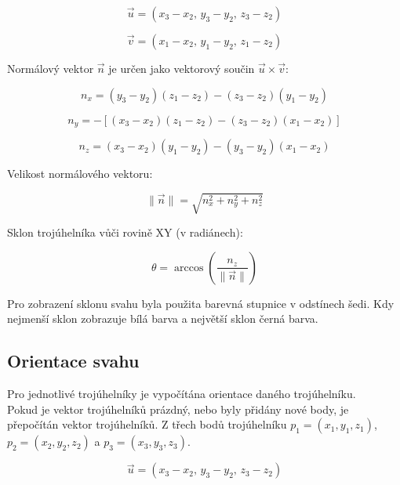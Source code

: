 \begin{equation}
\vec{u} = (x_3 - x_2,\, y_3 - y_2,\, z_3 - z_2)
\end{equation}

\begin{equation}
\vec{v} = (x_1 - x_2,\, y_1 - y_2,\, z_1 - z_2)
\end{equation}

Normálový vektor $\vec{n}$ je určen jako vektorový součin $\vec{u} \times \vec{v}$:

\begin{equation}
n_x = (y_3 - y_2)(z_1 - z_2) - (z_3 - z_2)(y_1 - y_2)
\end{equation}

\begin{equation}
n_y = -\left[(x_3 - x_2)(z_1 - z_2) - (z_3 - z_2)(x_1 - x_2)\right]
\end{equation}

\begin{equation}
n_z = (x_3 - x_2)(y_1 - y_2) - (y_3 - y_2)(x_1 - x_2)
\end{equation}

Velikost normálového vektoru:

\begin{equation}
\|\vec{n}\| = \sqrt{n_x^2 + n_y^2 + n_z^2}
\end{equation}

Sklon trojúhelníka vůči rovině XY (v radiánech):

\begin{equation}
\theta = \arccos\left( \frac{n_z}{\|\vec{n}\|} \right)
\end{equation}

Pro zobrazení sklonu svahu byla použita barevná stupnice v odstínech šedi. Kdy nejmenší sklon zobrazuje bílá barva a největší sklon černá barva.


\subsection{Orientace svahu}
Pro jednotlivé trojúhelníky je vypočítána orientace daného trojúhelníku.\\

\hspace{-1.15cm}
Pokud je vektor trojúhelníků prázdný, nebo byly přidány nové body, je přepočítán vektor trojúhelníků. Z třech bodů trojúhelníku  $p_1 = (x_1, y_1, z_1)$, $p_2 = (x_2, y_2, z_2)$ a $p_3 = (x_3, y_3, z_3)$.

\begin{equation}
\vec{u} = (x_3 - x_2,\, y_3 - y_2,\, z_3 - z_2)
\end{equation}

